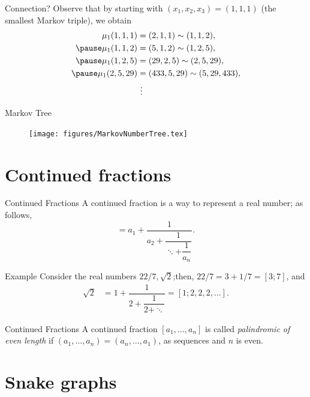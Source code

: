 \documentclass{beamer}
\begin{document}
\begin{frame}{Connection?}
    Observe that by starting with $(x_1,x_2,x_3) = (1,1,1)$ (the smallest Markov triple), we obtain \pause
    \begin{align*}
    \mu_1(1,1,1) &= (2,1,1) \sim (1,1,2), \\ \pause
    \mu_1(1,1,2) &= (5,1,2) \sim (1,2,5), \\ \pause
    \mu_1(1,2,5) &= (29,2,5) \sim (2,5,29), \\ \pause
    \mu_1(2,5,29) &= (433,5,29) \sim (5,29,433), \\
    & \ \vdots
\end{align*}
\end{frame}

\begin{frame}{Markov Tree}
\begin{figure}
    \centering
    \texttt{[image: figures/MarkovNumberTree.tex]}
\end{figure}    
\end{frame}

\section{Continued fractions}

\begin{frame}{Continued Fractions}
A continued fraction is a way to represent a real number; as follows, \pausa
\begin{equation*}
    [a_1,a_2,\dots,a_n] = a_1 + \dfrac{1}{a_2+\dfrac{1}{\ddots + \dfrac{1}{a_n}}}.
\end{equation*}
\pause
\begin{exampleblock}{Example}
    Consider the real numbers $22/7,\sqrt{2}$;\pause  then, $22/7 = 3+1/7 = [3;7]$, and 
    \pause
\begin{align*}
    \sqrt{2} &= 1 + \dfrac{1}{2+ \dfrac{1}{2 + \ddots}} = [1;2,2,2,\dots].
\end{align*} 
\end{exampleblock}
\end{frame}


\begin{frame}{Continued Fractions}
    A continued fraction $[a_1,\dots,a_n]$ is called \emph{palindromic of even length} if $(a_1,\dots,a_n) = (a_n,\dots,a_1)$, as sequences and $n$ is even. 
\end{frame}

\section{Snake graphs}
\end{document}
